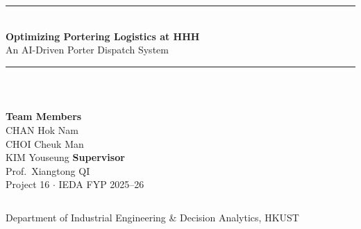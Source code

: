 \documentclass[aspectratio=169,14pt]{beamer}
\begin{document}

\begin{frame}
\vspace{0.5cm}
\begin{center}
  {\color{hkustblue}\rule{\linewidth}{2pt}}\\[0.4cm]
  {\Large\bfseries\color{hkustblue} Optimizing Portering Logistics at HHH}\\[0.2cm]
  {\large An AI-Driven Porter Dispatch System}\\[0.4cm]
  {\color{hkustblue}\rule{\linewidth}{2pt}}\\[0.6cm]

  \begin{columns}[t]
    \centering
    {\small\textbf{Team Members}}\\[0.2cm]
    {\small CHAN Hok Nam\\CHOI Cheuk Man\\KIM Youseung}
    \centering
    {\small\textbf{Supervisor}}\\[0.2cm]
    {\small Prof.\ Xiangtong QI}\\[0.3cm]
    {\small Project 16 $\cdot$ IEDA FYP 2025--26}
  \end{columns}

  \vspace{0.5cm}
  {\footnotesize Department of Industrial Engineering \& Decision Analytics, HKUST}
\end{center}
\end{frame}
\end{document}
